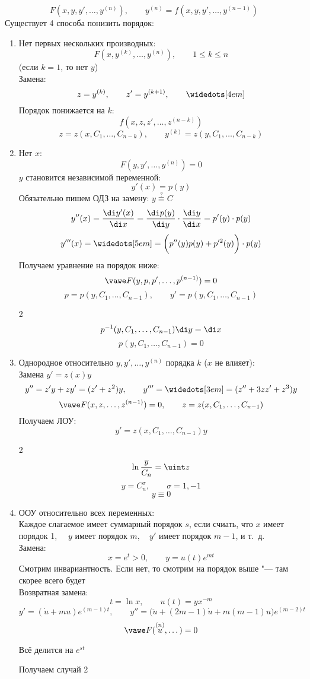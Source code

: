 $$ F(x, y, y', \dots, y^{(n)}), \qquad y^{(n)} = f(x, y, y', \dots, y^{(n - 1)}) $$
Существует 4 способа понизить порядок:
\begin{enumerate}
	\item Нет первых нескольких производных:
    $$ F(x, y^{(k)}, \dots, y^{(n)}), \qquad 1 \le k \le n $$
    (если $ k = 1$, то нет $ y $) \\
    Замена:
    $$ z = y^{(k)}, \qquad z' = y^{(k + 1)}, \qquad \widedots[4em] $$
    Порядок понижается на $ k $:
    $$ f(x, z, z', \dots, z^{(n - k)}) $$
    $$ z = z(x, C_1, \dots, C_{n - k}), \qquad y^{(k)} = z(y, C_1, \dots, C_{n - k}) $$
    \item Нет $ x $:
    $$ F(y, y', \dots, y^{(n)}) = 0 $$
    $ y $ становится независимой переменной:
    $$ y'(x) = p(y) $$
    Обязательно пишем ОДЗ на замену: $ y \stackrel?\equiv C $
    $$ y''(x) = \frac{\di y'(x)}{\di x} = \frac{\di p(y)}{\di y} \cdot \frac{\di y}{\di x}= p'(y) \cdot p(y) $$
    $$ y'''(x) = \widedots[5em] = \bigg( p''(y)p(y) + p'^2(y) \bigg) \cdot p(y) $$
    Получаем уравнение на порядок ниже:
    $$ \vawe F(y, p, p', \dots, p^{(n - 1)}) = 0 $$
    $$ p = p(y, C_1, \dots, C_{n - 1}), \qquad y' = p(y, C_1, \dots, C_{n - 1}) $$
    \antlersimp
    \begin{multicols}2
        $$ p^{-1}(y, C_1, \dots, C_{n - 1})\di y = \di x $$
        \columnbreak
        $$ p(y, C_1, \dots, C_{n - 1}) = 0 $$
    \end{multicols}
    \item Однородное относительно $ y, y', \dots, y^{(n)} $ порядка $ k $ ($ x $ не влияет): \\
    Замена $ y' = z(x)y $
    $$ y'' = z'y + zy' = (z' + z^2)y, \qquad y''' = \widedots[3em] = (z'' + 3zz' + z^3)y $$
    $$ \vawe F(x, z, \dots, z^{(n - 1)}) = 0, \qquad z = z(x, C_1, \dots, C_{n - 1}) $$
    Получаем ЛОУ:
    $$ y' = z(x, C_1, \dots, C_{n - 1})y $$
    \antlersimp
    \begin{multicols}2
        $$ \ln \frac{y}{C_n} = \uint z $$
        $$ y = C_n^\sigma, \qquad \sigma = 1, -1 $$
        \columnbreak
        $$ y \equiv 0 $$
    \end{multicols}
    \item ООУ относительно всех переменных: \\
    Каждое слагаемое имеет суммарный порядок $ s $, если счиать, что $ x $ имеет порядок 1, $ \quad y $ имеет порядок $ m, \quad y' $ имеет порядок $ m - 1 $, и т.~д. \\
    Замена:
    $$ x = e^t > 0, \qquad y = u(t)e^{mt} $$
    Смотрим инвариантность. Если нет, то смотрим на порядок выше "--- там скорее всего будет \\
    Возвратная замена:
    $$ t = \ln x, \qquad u(t) = yx^{-m} $$
    $$ y' = (\dot{u} + mu)e^{(m - 1)t}, \qquad y'' = \bigg( \ddot u + (2m - 1)\dot u + m(m - 1)u \bigg)e^{(m - 2)t} $$
    $$ \vawe F(\overset{(n)}u, \dots) = 0 $$
    \begin{control}
        Всё делится на $ e^{st} $
    \end{control}
    Получаем случай 2
\end{enumerate}

